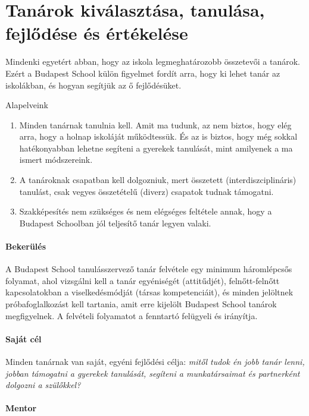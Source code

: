 \section{Tanárok kiválasztása, tanulása, fejlődése és értékelése}

Mindenki egyetért abban, hogy az iskola legmeghatározobb összetevői a tanárok. Ezért a Budapest School külön figyelmet fordít arra, hogy ki lehet tanár az iskolákban, és hogyan segítjük az ő fejlődésüket.

Alapelveink
\begin{enumerate}
\item Minden tanárnak tanulnia kell. Amit ma tudunk, az nem biztos, hogy elég arra, hogy a holnap iskoláját működtessük. És az is biztos, hogy még sokkal hatékonyabban lehetne segíteni a gyerekek tanulását, mint amilyenek a ma ismert módszereink.

\item A tanároknak csapatban kell dolgozniuk, mert összetett (interdiszciplináris) tanulást, csak vegyes összetételű (diverz) csapatok tudnak támogatni.

\item Szakképesítés nem szükséges és nem elégséges feltétele annak, hogy a Budapest Schoolban jól teljesítő tanár legyen valaki.
\end{enumerate}

\paragraph{Bekerülés}
A Budapest School tanulásszervező tanár felvétele egy minimum háromlépcsős folyamat, ahol vizsgálni kell a tanár egyéniségét (attitűdjét), felnőtt-felnőtt kapcsolatokban a viselkedésmódját (társas kompetenciáit), és minden jelöltnek próbafoglalkozást kell tartania, amit erre kijelölt Budapest School tanárok megfigyelnek. A felvételi folyamatot a fenntartó felügyeli és irányítja.

\paragraph{Saját cél}

Minden tanárnak van saját, egyéni fejlődési célja: \emph{mitől tudok én jobb tanár lenni, jobban támogatni a gyerekek tanulását, segíteni a munkatársaimat és partnerként dolgozni a szülőkkel?}

\paragraph{Mentor}

